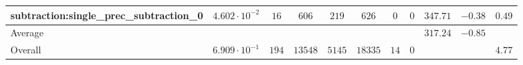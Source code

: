 \begin{tabular}{|l|c|c|c|c|c|c|c|c|c|c|}
subtraction:single\_prec\_subtraction\_0         & $ 4.602 \cdot 10^{-2} $ & $ 16     $ & $ 606   $ & $ 219  $ & $ 626   $ & $ 0  $ & $ 0 $ & $ 347.71      $ & $ -0.38   $ & $ 0.49    $ \\
\hline
Average                                          & $                     $ & $        $ & $       $ & $      $ & $       $ & $    $ & $   $ & $ 317.24      $ & $ -0.85   $ & $         $ \\
\hline
Overall                                          & $ 6.909 \cdot 10^{-1} $ & $ 194    $ & $ 13548 $ & $ 5145 $ & $ 18335 $ & $ 14 $ & $ 0 $ & $             $ & $         $ & $ 4.77    $ \\
\hline
\end{tabular}
